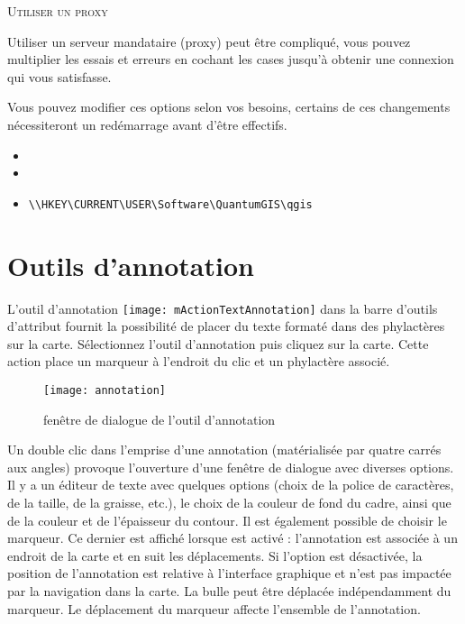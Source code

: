 \begin{Tip} \caption{\textsc{Utiliser un proxy}}
Utiliser un serveur mandataire (proxy) peut être compliqué, vous pouvez multiplier les essais et erreurs en cochant les cases jusqu'à obtenir une connexion qui vous satisfasse.
\end{Tip}

Vous pouvez modifier ces options selon vos besoins, certains de ces changements nécessiteront un redémarrage avant d'être effectifs.

\begin{itemize}[label=--]
\item {}
\item {}
\item {}
\begin{verbatim}
\\HKEY\CURRENT\USER\Software\QuantumGIS\qgis
\end{verbatim}
\end{itemize}

\section{Outils d'annotation} \label{sec:annotations}

L'outil d'annotation \texttt{[image: mActionTextAnnotation]} dans la barre d'outils d'attribut fournit la possibilité de placer du texte formaté dans des phylactères sur la carte. Sélectionnez l'outil d'annotation puis cliquez sur la carte. Cette action place un marqueur à l'endroit du clic et un phylactère associé.

\begin{figure}[ht]
   \centering
   \texttt{[image: annotation]}
   \caption{fenêtre de dialogue de l'outil d'annotation \nixcaption}
   \label{fig:annotation}
\end{figure}

Un double clic dans l'emprise d'une annotation (matérialisée par quatre carrés aux angles) provoque l'ouverture d'une fenêtre de dialogue avec diverses options. Il y a un éditeur de texte avec quelques options (choix de la police de caractères, de la taille, de la graisse, etc.), le choix de la couleur de fond du cadre, ainsi que de la couleur et de l'épaisseur du contour. Il est également possible de choisir le marqueur. Ce dernier est affiché lorsque  est activé : l'annotation est associée à un endroit de la carte et en suit les déplacements. Si l'option est désactivée, la position de l'annotation est relative à l'interface graphique et n'est pas impactée par la navigation dans la carte. La bulle peut être déplacée indépendamment du marqueur. Le déplacement du marqueur affecte l'ensemble de l'annotation.

